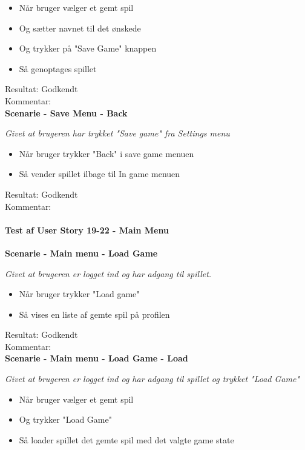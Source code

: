 \begin{itemize}
  \item Når bruger vælger et gemt spil
  \item Og sætter navnet til det ønskede
  \item Og trykker på "Save Game" knappen
  \item Så genoptages spillet
\end{itemize}

Resultat: Godkendt\\
Kommentar:\\

\bf{Scenarie - Save Menu - Back}

\it{Givet at brugeren har trykket "Save game" fra Settings menu}

\begin{itemize}
  \item Når bruger trykker "Back" i save game menuen
  \item Så vender spillet ilbage til In game menuen
\end{itemize}

Resultat: Godkendt\\
Kommentar:\\

\paragraph{Test af User Story 19-22 - Main Menu}

\bf{Scenarie - Main menu - Load Game}

\it{Givet at brugeren er logget ind og har adgang til spillet.}

\begin{itemize}
  \item Når bruger trykker "Load game"
  \item Så vises en liste af gemte spil på profilen
\end{itemize}

Resultat: Godkendt\\
Kommentar:\\

\bf{Scenarie - Main menu - Load Game - Load}

\it{Givet at brugeren er logget ind og har adgang til spillet og trykket "Load Game"}

\begin{itemize}
  \item Når bruger vælger et gemt spil
  \item Og trykker "Load Game"
  \item Så loader spillet det gemte spil med det valgte game state
\end{itemize}

